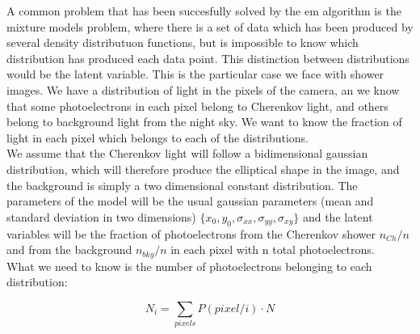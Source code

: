 \documentclass[main.tex]{subfiles}
\begin{document}
A common problem that has been succesfully solved by the \gls{em} algorithm is the mixture models problem, where there is a set of data which has been produced by several density distributuon functions, but is impossible to know which distribution has produced each data point. This distinction between distributions would be the latent variable. This is the particular case we face with shower images. We have a distribution of light in the pixels of the camera, an we know that some photoelectrons in each pixel belong to Cherenkov light, and others belong to background light from the night sky. We want to know the fraction of light in each pixel which belongs to each of the distributions.\\
We assume that the Cherenkov light will follow a bidimensional gaussian distribution, which will therefore produce the elliptical shape in the image, and the background is simply a two dimensional constant distribution. The parameters of the model will be the usual gaussian parameters (mean and standard deviation in two dimensions) $\{x_{0}, y_{0},\sigma_{xx}, \sigma_{yy}, \sigma_{xy}\}$ and the latent variables will be the fraction of photoelectrons from the Cherenkov shower $n_{Ch}/n$ and from the background $n_{bkg}/n$ in each pixel with n total photoelectrons.\\

What we need to know is the number of photoelectrons belonging to each distribution:

\begin{equation}
  N_{i} = \sum_{pixels} P(pixel/i)\cdot N
\end{equation}
\end{document}
